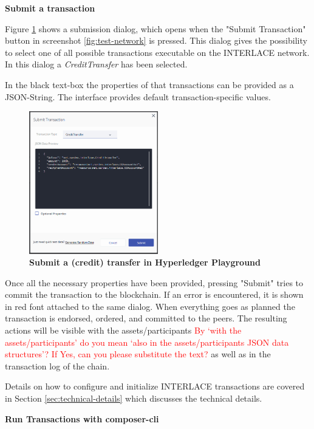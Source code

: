 \textbf{Submit a transaction}

Figure \ref{fig:submit-credit-transfer} shows a submission dialog, which opens when the "Submit Transaction" button in screenshot \ref{fig:test-network} is pressed. This dialog gives the possibility to select one of all possible transactions executable on the INTERLACE network. In this dialog a \textit{CreditTransfer} has been selected.

In the black text-box the properties of that transactions can be provided as a JSON-String. The interface provides default transaction-specific values.

\begin{figure}[htbp]
  \centering
  \includegraphics[width=0.5\textwidth]{Figures/submit-credit-transfer}
  \caption{\bf\small Submit a (credit) transfer in Hyperledger Playground}
  \label{fig:submit-credit-transfer}
\end{figure}

Once all the necessary properties have been provided, pressing "Submit" tries to commit the transaction to the blockchain. If an error is encountered, it is shown in red font attached to the same dialog. When everything goes as planned the transaction is endorsed, ordered, and committed to the peers. The resulting actions will be visible with the assets/participants
\textcolor{red}{By `with the assets/participants' do you mean `also in the assets/participants JSON data structures'? If Yes, can you please substitute the text?} as well as in the transaction log of the chain.

Details on how to configure and initialize INTERLACE transactions are covered in Section \ref{sec:technical-details} which discusses the technical details.

\textbf{Run Transactions with composer-cli}

